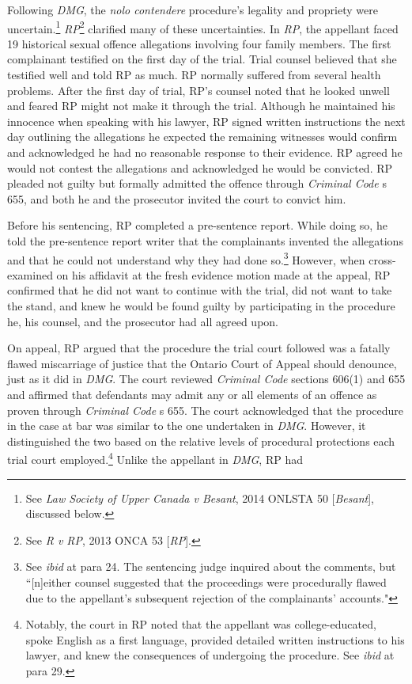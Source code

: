 Following \textit{DMG}, the \textit{nolo contendere} procedure's legality and propriety were uncertain.\footnote{See \textit{Law Society of Upper Canada v Besant}, 2014 ONLSTA 50 [\textit{Besant}], discussed below.} \textit{RP}\footnote{See \textit{R v RP}, 2013 ONCA 53 [\textit{RP}].} clarified many of these uncertainties. In \textit{RP}, the appellant faced 19 historical sexual offence allegations involving four family members. The first complainant testified on the first day of the trial. Trial counsel believed that she testified well and told RP as much. RP normally suffered from several health problems. After the first day of trial, RP's counsel noted that he looked unwell and feared RP might not make it through the trial. Although he maintained his innocence when speaking with his lawyer, RP signed written instructions the next day outlining the allegations he expected the remaining witnesses would confirm and acknowledged he had no reasonable response to their evidence. RP agreed he would not contest the allegations and acknowledged he would be convicted. RP pleaded not guilty but formally admitted the offence through \textit{Criminal Code} s 655, and both he and the prosecutor invited the court to convict him.

Before his sentencing, RP completed a pre-sentence report. While doing so, he told the pre-sentence report writer that the complainants invented the allegations and that he could not understand why they had done so.\footnote{See \textit{ibid} at para 24. The sentencing judge inquired about the comments, but ``[n]either counsel suggested that the proceedings were procedurally flawed due to the appellant's subsequent rejection of the complainants' accounts."} However, when cross-examined on his affidavit at the fresh evidence motion made at the appeal, RP confirmed that he did not want to continue with the trial, did not want to take the stand, and knew he would be found guilty by participating in the procedure he, his counsel, and the prosecutor had all agreed upon.

On appeal, RP argued that the procedure the trial court followed was a fatally flawed miscarriage of justice that the Ontario Court of Appeal should denounce, just as it did in \textit{DMG}. The court reviewed \textit{Criminal Code} sections 606(1) and 655 and affirmed that defendants may admit any or all elements of an offence as proven through \textit{Criminal Code} s 655. The court acknowledged that the procedure in the case at bar was similar to the one undertaken in \textit{DMG}. However, it distinguished the two based on the relative levels of procedural protections each trial court employed.\footnote{Notably, the court in RP noted that the appellant was college-educated, spoke English as a first language, provided detailed written instructions to his lawyer, and knew the consequences of undergoing the procedure. See \textit{ibid} at para 29.} Unlike the appellant in \textit{DMG}, RP had 

